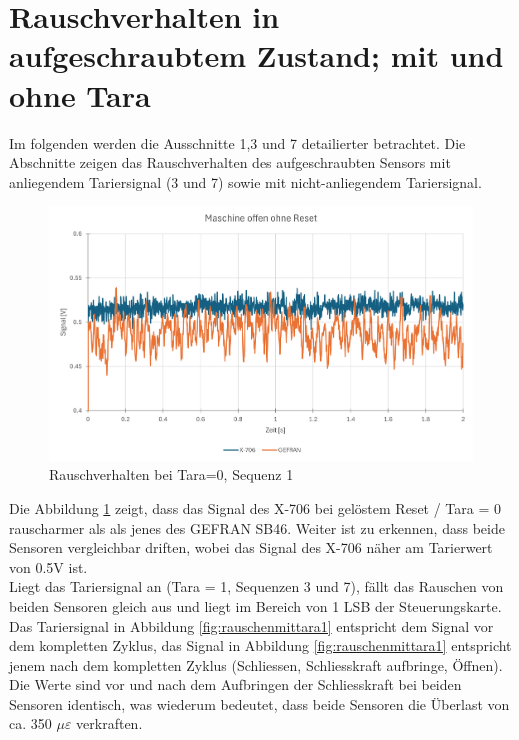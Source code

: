 \documentclass[12pt,a4paper]{article}
\begin{document}
\section{Rauschverhalten in aufgeschraubtem Zustand; mit und ohne Tara}\label{sec:rauschen}
Im folgenden werden die Ausschnitte 1,3 und 7 detailierter betrachtet. Die Abschnitte zeigen das Rauschverhalten des aufgeschraubten Sensors mit anliegendem Tariersignal (3 und 7) sowie mit nicht-anliegendem Tariersignal.
\begin{figure}[H]
	\centering
	\includegraphics[width=1\linewidth]{imgs/rauschen_ohne_tara}
	\caption{Rauschverhalten bei Tara=0, Sequenz 1}
	\label{fig:rauschenohnetara}
\end{figure}\noindent
Die Abbildung \ref{fig:rauschenohnetara}  zeigt, dass das Signal des X-706 bei gelöstem Reset / Tara = 0 rauscharmer als als jenes des GEFRAN SB46. Weiter ist zu erkennen, dass beide Sensoren vergleichbar driften, wobei das Signal des X-706 näher am Tarierwert von 0.5V ist.\\
Liegt das Tariersignal an (Tara = 1, Sequenzen 3 und 7), fällt das Rauschen von beiden Sensoren gleich aus und liegt im Bereich von 1 LSB der Steuerungskarte. Das Tariersignal in Abbildung \ref{fig:rauschenmittara1} entspricht dem Signal vor dem kompletten Zyklus, das Signal in Abbildung \ref{fig:rauschenmittara1} entspricht jenem nach dem kompletten Zyklus (Schliessen, Schliesskraft aufbringe, Öffnen). Die Werte sind vor und nach dem Aufbringen der Schliesskraft bei beiden Sensoren identisch, was wiederum bedeutet, dass beide Sensoren die Überlast von ca. 350 $\mu\varepsilon$ verkraften.
\end{document}

